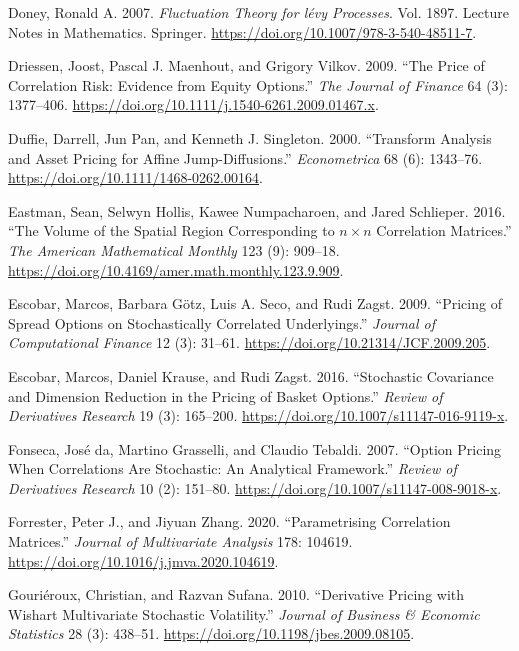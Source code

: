 \documentclass[
  english,
  11pt,
  letterpaper,
  DIV=11,
  numbers=noendperiod]{scrartcl}
\newlength{\cslhangindent}
\newenvironment{CSLReferences}[2] %
 {\begin{list}{}{%
  \setlength{\itemindent}{0pt}
  \setlength{\leftmargin}{0pt}
  \setlength{\parsep}{0pt}
  \ifodd #1
   \setlength{\leftmargin}{\cslhangindent}
   \setlength{\itemindent}{-1\cslhangindent}
  \fi
  \setlength{\itemsep}{#2\baselineskip}}}
 {\end{list}}
\theoremstyle{plain}
\theoremstyle{plain}
\theoremstyle{plain}
\theoremstyle{plain}
\theoremstyle{remark}
\begin{document}
\begin{CSLReferences}{1}{1}
Doney, Ronald A. 2007. \emph{Fluctuation Theory for l{é}vy Processes}.
Vol. 1897. Lecture Notes in Mathematics. Springer.
\url{https://doi.org/10.1007/978-3-540-48511-7}.

Driessen, Joost, Pascal J. Maenhout, and Grigory Vilkov. 2009. {``The
Price of Correlation Risk: Evidence from Equity Options.''} \emph{The
Journal of Finance} 64 (3): 1377--406.
\url{https://doi.org/10.1111/j.1540-6261.2009.01467.x}.

Duffie, Darrell, Jun Pan, and Kenneth J. Singleton. 2000. {``Transform
Analysis and Asset Pricing for Affine Jump-Diffusions.''}
\emph{Econometrica} 68 (6): 1343--76.
\url{https://doi.org/10.1111/1468-0262.00164}.

Eastman, Sean, Selwyn Hollis, Kawee Numpacharoen, and Jared Schlieper.
2016. {``The Volume of the Spatial Region Corresponding to
{\(n \times n\)} Correlation Matrices.''} \emph{The American
Mathematical Monthly} 123 (9): 909--18.
\url{https://doi.org/10.4169/amer.math.monthly.123.9.909}.

Escobar, Marcos, Barbara Götz, Luis A. Seco, and Rudi Zagst. 2009.
{``Pricing of Spread Options on Stochastically Correlated
Underlyings.''} \emph{Journal of Computational Finance} 12 (3): 31--61.
\url{https://doi.org/10.21314/JCF.2009.205}.

Escobar, Marcos, Daniel Krause, and Rudi Zagst. 2016. {``Stochastic
Covariance and Dimension Reduction in the Pricing of Basket Options.''}
\emph{Review of Derivatives Research} 19 (3): 165--200.
\url{https://doi.org/10.1007/s11147-016-9119-x}.

Fonseca, José da, Martino Grasselli, and Claudio Tebaldi. 2007.
{``Option Pricing When Correlations Are Stochastic: An Analytical
Framework.''} \emph{Review of Derivatives Research} 10 (2): 151--80.
\url{https://doi.org/10.1007/s11147-008-9018-x}.

Forrester, Peter J., and Jiyuan Zhang. 2020. {``Parametrising
Correlation Matrices.''} \emph{Journal of Multivariate Analysis} 178:
104619. \url{https://doi.org/10.1016/j.jmva.2020.104619}.

Gouriéroux, Christian, and Razvan Sufana. 2010. {``Derivative Pricing
with {Wishart} Multivariate Stochastic Volatility.''} \emph{Journal of
Business \& Economic Statistics} 28 (3): 438--51.
\url{https://doi.org/10.1198/jbes.2009.08105}.


\end{CSLReferences}
\end{document}
